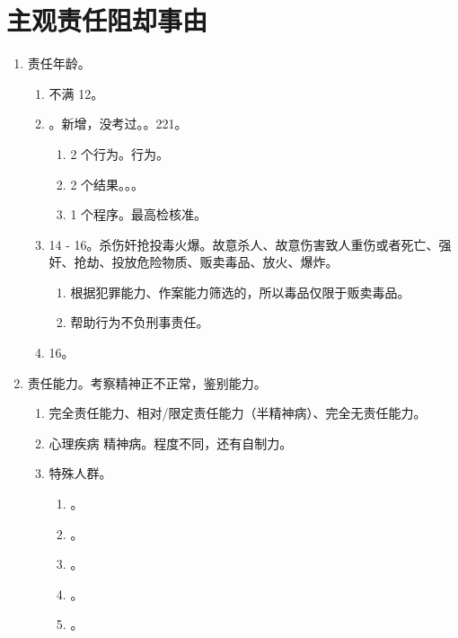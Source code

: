 \section{主观责任阻却事由}
\begin{enumerate}
  \item 责任年龄。
        \begin{enumerate}
          \item 不满 12。
          \item {}。新增，没考过。。221。
                \begin{enumerate}
                  \item 2 个行为。行为。
                  \item 2 个结果。。。
                  \item 1 个程序。最高检核准。
                \end{enumerate}
          \item 14 - 16。杀伤奸抢投毒火爆。故意杀人、故意伤害致人重伤或者死亡、强奸、抢劫、投放危险物质、贩卖毒品、放火、爆炸。
                \begin{enumerate}
                  \item 根据犯罪能力、作案能力筛选的，所以毒品仅限于贩卖毒品。
                  \item 帮助行为不负刑事责任。
                \end{enumerate}
          \item 16。
        \end{enumerate}
  \item 责任能力。考察精神正不正常，鉴别能力。
        \begin{enumerate}
          \item 完全责任能力、相对/限定责任能力（半精神病）、完全无责任能力。
          \item 心理疾病 \bdy 精神病。程度不同，还有自制力。
          \item 特殊人群。
                \begin{enumerate}
                  \item {}。
                  \item {}。
                  \item {}。
                  \item {}。
                  \item {}。

\end{enumerate}
\end{enumerate}
\end{enumerate}
